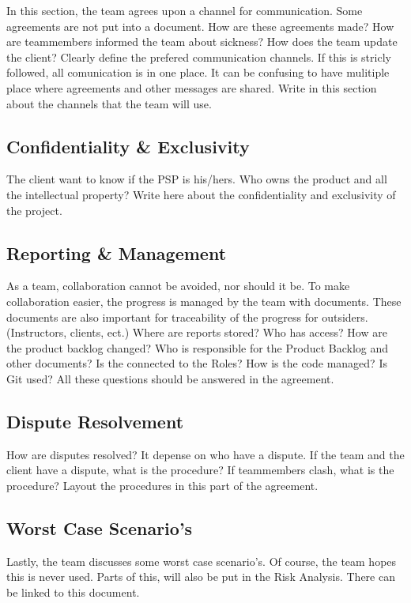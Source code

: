 \documentclass[10pt]{report}
\begin{document}
In this section, the team agrees upon a channel for communication. Some agreements are not put into a document. How are these agreements made? How are teammembers informed the team about sickness? How does the team update the client? Clearly define the prefered communication channels. If this is stricly followed, all comunication is in one place. It can be confusing to have mulitiple place where agreements and other messages are shared. Write in this section about the channels that the team will use.

\subsection{Confidentiality \& Exclusivity}

The client want to know if the PSP is his/hers. Who owns the product and all the intellectual property? Write here about the confidentiality and exclusivity of the project.

\subsection{Reporting \& Management}

As a team, collaboration cannot be avoided, nor should it be. To make collaboration easier, the progress is managed by the team with documents. These documents are also important for traceability of the progress for outsiders. (Instructors, clients, ect.) Where are reports stored? Who has access? How are the product backlog changed? Who is responsible for the Product Backlog and other documents? Is the connected to the Roles? How is the code managed? Is Git used? All these questions should be answered in the agreement.

\subsection{Dispute Resolvement}

How are disputes resolved? It depense on who have a dispute. If the team and the client have a dispute, what is the procedure? If teammembers clash, what is the procedure? Layout the procedures in this part of the agreement.

\subsection{Worst Case Scenario's}

Lastly, the team discusses some worst case scenario's. Of course, the team hopes this is never used. Parts of this, will also be put in the Risk Analysis. There can be linked to this document.
\end{document}
